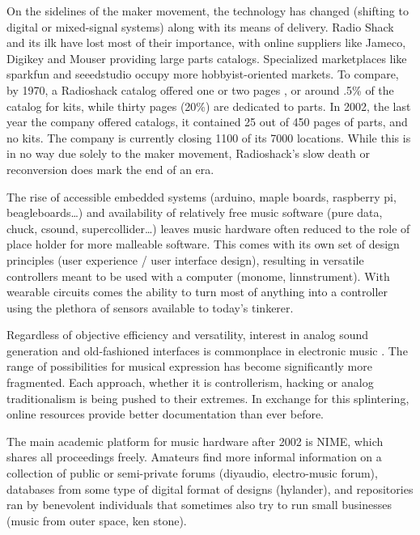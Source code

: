 On the sidelines of the maker movement, the technology has changed (shifting to digital or mixed-signal systems) along with its means of delivery. Radio Shack and its ilk have lost most of their importance, with online suppliers like Jameco, Digikey and Mouser providing large parts catalogs. Specialized marketplaces like sparkfun and seeedstudio occupy more hobbyist-oriented markets. To compare, by 1970, a Radioshack catalog offered one or two pages , or around .5\% of the catalog for kits, while thirty pages (20\%) are dedicated to parts. In 2002, the last year the company offered catalogs, it contained 25 out of 450 pages of parts, and no kits. The company is currently closing 1100 of its 7000 locations. While this is in no way due solely to the maker movement, Radioshack’s slow death or reconversion does mark the end of an era. 

The rise of accessible embedded systems (arduino, maple boards, raspberry pi, beagleboards…) and availability of relatively free music software (pure data, chuck, csound, supercollider…) leaves music hardware often reduced to the role of place holder for more malleable software. This comes with its own set of design principles (user experience / user interface design), resulting in versatile controllers meant to be used with a computer (monome, linnstrument). With wearable circuits comes the ability to turn most of anything into a controller using the plethora of sensors available to today’s tinkerer. 

Regardless of objective efficiency and versatility, interest in analog sound generation and old-fashioned interfaces is commonplace in electronic music \cite{collins2006}. The range of possibilities for musical expression has become significantly more fragmented. Each approach, whether it is controllerism, hacking or analog traditionalism is being pushed to their extremes. In exchange for this splintering, online resources provide better documentation than ever before.

The main academic platform for music hardware after 2002 is NIME, which shares all proceedings freely. Amateurs find more informal information on a collection of public or semi-private forums (diyaudio, electro-music forum), databases from some type of digital format of designs (hylander), and repositories ran by benevolent individuals that sometimes also try to run small businesses (music from outer space, ken stone).

